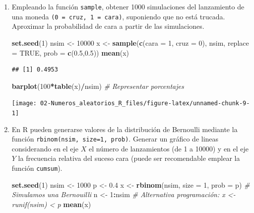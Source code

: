 \documentclass[]{book}
\newenvironment{Shaded}{\begin{snugshade}}{\end{snugshade}}
\newcommand{\KeywordTok}[1]{\textcolor[rgb]{0.13,0.29,0.53}{\textbf{#1}}}
\newcommand{\DataTypeTok}[1]{\textcolor[rgb]{0.13,0.29,0.53}{#1}}
\newcommand{\DecValTok}[1]{\textcolor[rgb]{0.00,0.00,0.81}{#1}}
\newcommand{\FloatTok}[1]{\textcolor[rgb]{0.00,0.00,0.81}{#1}}
\newcommand{\StringTok}[1]{\textcolor[rgb]{0.31,0.60,0.02}{#1}}
\newcommand{\CommentTok}[1]{\textcolor[rgb]{0.56,0.35,0.01}{\textit{#1}}}
\newcommand{\OtherTok}[1]{\textcolor[rgb]{0.56,0.35,0.01}{#1}}
\newcommand{\OperatorTok}[1]{\textcolor[rgb]{0.81,0.36,0.00}{\textbf{#1}}}
\newcommand{\NormalTok}[1]{#1}
\theoremstyle{definition}
\theoremstyle{definition}
\theoremstyle{definition}
\theoremstyle{remark}
\begin{document}
\begin{enumerate}
\def\labelenumi{\alph{enumi})}
\item
  Empleando la función \texttt{sample}, obtener 1000 simulaciones del
  lanzamiento de una moneda \texttt{(0\ =\ cruz,\ 1\ =\ cara)},
  suponiendo que no está trucada. Aproximar la probabilidad de cara a
  partir de las simulaciones.

\begin{Shaded}
\begin{Highlighting}[]
\KeywordTok{set.seed}\NormalTok{(}\DecValTok{1}\NormalTok{)}
\NormalTok{nsim <-}\StringTok{ }\DecValTok{10000}
\NormalTok{x <-}\StringTok{ }\KeywordTok{sample}\NormalTok{(}\KeywordTok{c}\NormalTok{(}\DataTypeTok{cara =} \DecValTok{1}\NormalTok{, }\DataTypeTok{cruz =} \DecValTok{0}\NormalTok{), nsim, }\DataTypeTok{replace =} \OtherTok{TRUE}\NormalTok{, }\DataTypeTok{prob =} \KeywordTok{c}\NormalTok{(}\FloatTok{0.5}\NormalTok{,}\FloatTok{0.5}\NormalTok{))}
\KeywordTok{mean}\NormalTok{(x)}
\end{Highlighting}
\end{Shaded}

\begin{verbatim}
## [1] 0.4953
\end{verbatim}

\begin{Shaded}
\begin{Highlighting}[]
\KeywordTok{barplot}\NormalTok{(}\DecValTok{100}\OperatorTok{*}\KeywordTok{table}\NormalTok{(x)}\OperatorTok{/}\NormalTok{nsim) }\CommentTok{# Representar porcentajes }
\end{Highlighting}
\end{Shaded}

  \begin{center}\texttt{[image: 02-Numeros\_aleatorios\_R\_files/figure-latex/unnamed-chunk-9-1]} \end{center}
\item
  En R pueden generarse valores de la distribución de Bernoulli mediante
  la función \texttt{rbinom(nsim,\ size=1,\ prob)}. Generar un gráfico
  de lineas considerando en el eje \(X\) el número de lanzamientos (de 1
  a 10000) y en el eje \(Y\) la frecuencia relativa del suceso cara
  (puede ser recomendable emplear la función \texttt{cumsum}).

\begin{Shaded}
\begin{Highlighting}[]
\KeywordTok{set.seed}\NormalTok{(}\DecValTok{1}\NormalTok{)}
\NormalTok{nsim <-}\StringTok{ }\DecValTok{1000}
\NormalTok{p <-}\StringTok{ }\FloatTok{0.4}
\NormalTok{x <-}\StringTok{ }\KeywordTok{rbinom}\NormalTok{(nsim, }\DataTypeTok{size =} \DecValTok{1}\NormalTok{, }\DataTypeTok{prob =}\NormalTok{ p) }\CommentTok{# Simulamos una Bernouilli}
\NormalTok{n <-}\StringTok{ }\DecValTok{1}\OperatorTok{:}\NormalTok{nsim}
\CommentTok{# Alternativa programación: x <- runif(nsim) < p}
\KeywordTok{mean}\NormalTok{(x)}
\end{Highlighting}
\end{Shaded}


\end{enumerate}
\end{document}
